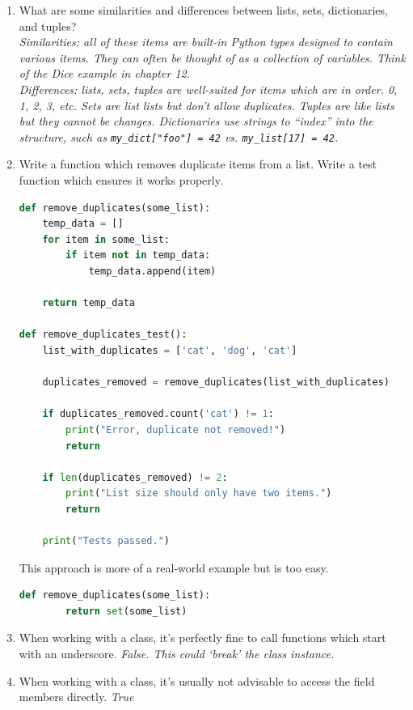 \documentclass[letter,10pt]{article}
\begin{document}
\begin{enumerate}
    \item What are some similarities and differences between lists, sets, dictionaries, and tuples? \\
    \textit{Similarities: all of these items are built-in Python types designed to contain various items. They can often be thought of as a collection of variables. Think of the Dice example in chapter 12.} \\
    \textit{Differences: lists, sets, tuples are well-suited for items which are in order. 0, 1, 2, 3, etc. Sets are list lists but don't allow duplicates. Tuples are like lists but they cannot be changes. Dictionaries use strings to ``index'' into the structure, such as \texttt{my\_dict["foo"] = 42} vs. \texttt{my\_list[17] = 42}.}
    
    \item Write a function which removes duplicate items from a list. Write a test function which ensures it works properly.
    \begin{lstlisting}[language=python]
def remove_duplicates(some_list):
    temp_data = []
    for item in some_list:
        if item not in temp_data:
            temp_data.append(item)
    
    return temp_data

def remove_duplicates_test():
    list_with_duplicates = ['cat', 'dog', 'cat']
    
    duplicates_removed = remove_duplicates(list_with_duplicates)
    
    if duplicates_removed.count('cat') != 1:
        print("Error, duplicate not removed!")
        return
    
    if len(duplicates_removed) != 2:
        print("List size should only have two items.")
        return
    
    print("Tests passed.")
    \end{lstlisting}
    
    This approach is more of a real-world example but is too easy.
    \begin{lstlisting}[language=python]
    def remove_duplicates(some_list):
        return set(some_list)
    \end{lstlisting}
    
    \item When working with a class, it's perfectly fine to call functions which start with an underscore. \textit{False. This could `break' the class instance.}
    
    \item When working with a class, it's usually not advisable to access the field members directly. \textit{True}
    

\end{enumerate}
\end{document}
